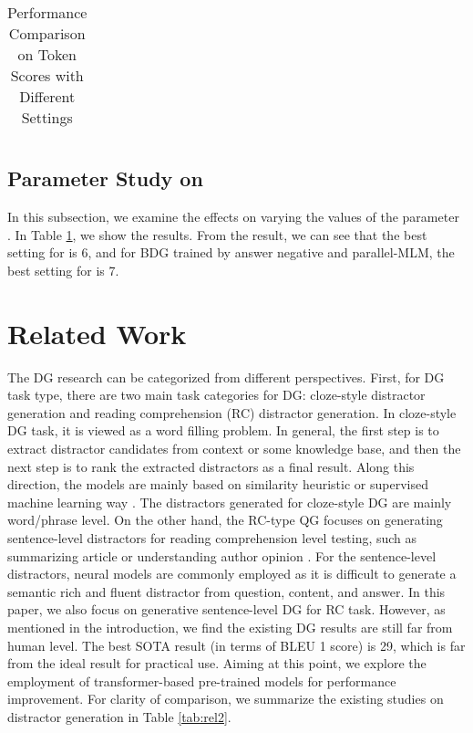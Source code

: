 \documentclass[11pt,a4paper]{article}
\begin{document}
\begin{table}
{\begin{tabular}{|l|l|l|l|l|l|}
    
    \end{tabular}
    }
    \caption{Performance Comparison on Token Scores with Different  Settings}
    \label{tab:toke_score_pm_overview}
\end{table}

\subsection{Parameter Study on }\label{subsec:parameter_study}
In this subsection, we examine the effects on varying the values of the parameter . In Table \ref{tab:toke_score_pm_overview}, we show the results. From the result, we can see that the best setting for  is 6, and for BDG trained by answer negative and parallel-MLM, the best setting for  is 7.






















 \section{Related Work}\label{sec:related}
The DG research can be categorized from different perspectives. First, for DG task type, there are two main task categories for DG: cloze-style distractor generation and reading comprehension (RC) distractor generation. In cloze-style DG task, it is viewed as a word filling problem. In general, the first step is to extract distractor candidates from context or some knowledge base, and then the next step is to rank the extracted distractors as a final result. Along this direction, the models are mainly based on similarity heuristic \cite{sumita2005measuring,mitkov2006computer,guo2016questimator,ren2020knowledge} or supervised machine learning way \cite{liang2018distractor,yeung2019difficulty}. The distractors generated for cloze-style DG are mainly word/phrase level. On the other hand, the RC-type QG focuses on generating sentence-level distractors for reading comprehension level testing, such as summarizing article or understanding author opinion \cite{gao2019generating,zhou2019coattention}. For the sentence-level distractors, neural models are commonly employed as it is difficult to generate a semantic rich and fluent distractor from question, content, and answer.
In this paper, we also focus on generative sentence-level DG for RC task. However, as mentioned in the introduction, we find the existing DG results are still far from human level. The best SOTA result (in terms of BLEU 1 score) is 29, which is far from the ideal result for practical use. Aiming at this point, we explore the employment of transformer-based pre-trained models for performance improvement. For clarity of comparison, we summarize the existing studies on distractor generation in Table \ref{tab:rel2}.
\end{document}
